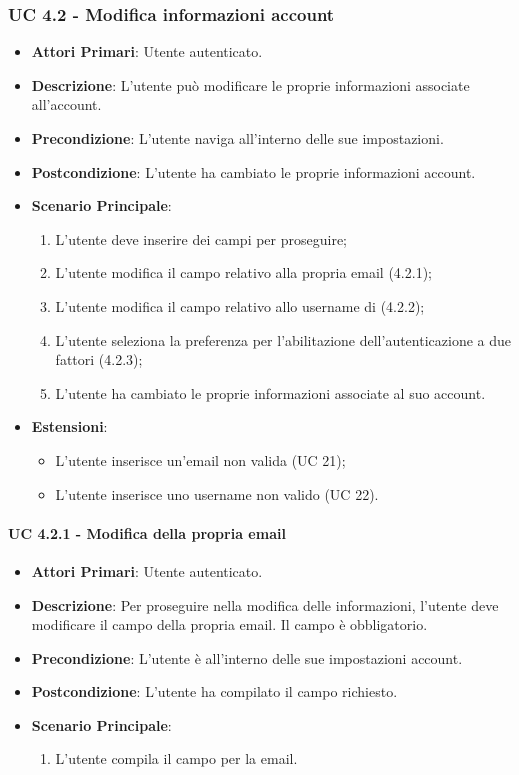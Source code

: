 			\subsubsection{UC 4.2 - Modifica informazioni account}
			\begin{itemize}
				\item \textbf{Attori Primari}: Utente autenticato.
				\item \textbf{Descrizione}: L'utente può modificare le proprie informazioni associate all'account.
				\item \textbf{Precondizione}: L'utente naviga all'interno delle sue impostazioni.
				\item \textbf{Postcondizione}: L'utente ha cambiato le proprie informazioni account.
				\item \textbf{Scenario Principale}:
				\begin{enumerate}
					\item L'utente deve inserire dei campi per proseguire;
					\item L'utente modifica il campo relativo alla propria email (4.2.1);
					\item L'utente modifica il campo relativo allo username di  (4.2.2);
					\item L'utente seleziona la preferenza per l'abilitazione dell'autenticazione a due fattori (4.2.3);
					\item L'utente ha cambiato le proprie informazioni associate al suo account.
				\end{enumerate}	
				\item \textbf{Estensioni}:
					\begin{itemize}
						\item L'utente inserisce un'email non valida (UC 21);
						\item L'utente inserisce uno username  non valido (UC 22).
					\end{itemize}
			\end{itemize}

				\paragraph{UC 4.2.1 - Modifica della propria email}
				\begin{itemize}
					\item \textbf{Attori Primari}: Utente autenticato.
					\item \textbf{Descrizione}: Per proseguire nella modifica delle informazioni, l'utente deve modificare il campo della propria email. Il campo è obbligatorio.
					\item \textbf{Precondizione}: L'utente è all'interno delle sue impostazioni account.
					\item \textbf{Postcondizione}: L'utente ha compilato il campo richiesto.
					\item \textbf{Scenario Principale}:
					\begin{enumerate}
						\item L'utente compila il campo per la email.
					\end{enumerate}
				\end{itemize}


